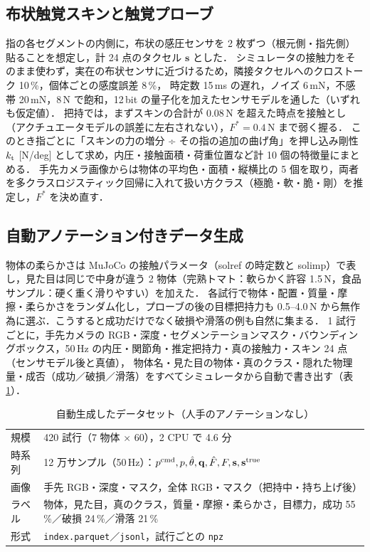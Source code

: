 \documentclass[a4paper,twocolumn,10pt]{ltjsarticle}
\begin{document}
\subsection{布状触覚スキンと触覚プローブ}
指の各セグメントの内側に，布状の感圧センサを 2 枚ずつ（根元側・指先側）貼ることを想定し，計 24 点のタクセル $\mathbf s$ とした．
シミュレータの接触力をそのまま使わず，実在の布状センサに近づけるため，隣接タクセルへのクロストーク 10\,\%，個体ごとの感度誤差 8\,\%，
時定数 15\,ms の遅れ，ノイズ 6\,mN，不感帯 20\,mN，8\,N で飽和，12\,bit の量子化を加えたセンサモデルを通した（いずれも仮定値）．
把持では，まずスキンの合計が 0.08\,N を超えた時点を接触とし（アクチュエータモデルの誤差に左右されない），$F^*=0.4$\,N まで弱く握る．
このとき指ごとに「スキンの力の増分 ÷ その指の追加の曲げ角」を押し込み剛性 $k_{\rm t}$ [N/deg] として求め，内圧・接触面積・荷重位置など計 10 個の特徴量にまとめる．
手先カメラ画像からは物体の平均色・面積・縦横比の 5 個を取り，両者を多クラスロジスティック回帰に入れて扱い方クラス（極脆・軟・脆・剛）を推定し，$F^*$ を決め直す．

\subsection{自動アノテーション付きデータ生成}
物体の柔らかさは MuJoCo の接触パラメータ（solref の時定数と solimp）で表し，見た目は同じで中身が違う 2 物体（完熟トマト：軟らかく許容 1.5\,N，食品サンプル：硬く重く滑りやすい）を加えた．
各試行で物体・配置・質量・摩擦・柔らかさをランダム化し，プローブの後の目標把持力も 0.5--4.0\,N から無作為に選ぶ．こうすると成功だけでなく破損や滑落の例も自然に集まる．
1 試行ごとに，手先カメラの RGB・深度・セグメンテーションマスク・バウンディングボックス，50\,Hz の内圧・関節角・推定把持力・真の接触力・スキン 24 点（センサモデル後と真値），
物体名・見た目の物体・真のクラス・隠れた物理量・成否（成功／破損／滑落）をすべてシミュレータから自動で書き出す（表\ref{tab:ds}）．

\begin{table}[t]
\centering\small
\caption{自動生成したデータセット（人手のアノテーションなし）}
\label{tab:ds}
\begin{tabular}{@{}p{20mm}p{50mm}@{}}
\toprule
規模 & 420 試行（7 物体 × 60），2 CPU で 4.6 分 \\
時系列 & 12 万サンプル（50\,Hz）：$p^{\rm cmd}, p, \hat\theta, \mathbf q, \hat F, F, \mathbf s, \mathbf s^{\rm true}$ \\
画像 & 手先 RGB・深度・マスク，全体 RGB・マスク（把持中・持ち上げ後） \\
ラベル & 物体，見た目，真のクラス，質量・摩擦・柔らかさ，目標力，成功 55\,\%／破損 24\,\%／滑落 21\,\% \\
形式 & \texttt{index.parquet}／\texttt{jsonl}，試行ごとの \texttt{npz} \\
\bottomrule
\end{tabular}
\end{table}
\end{document}
